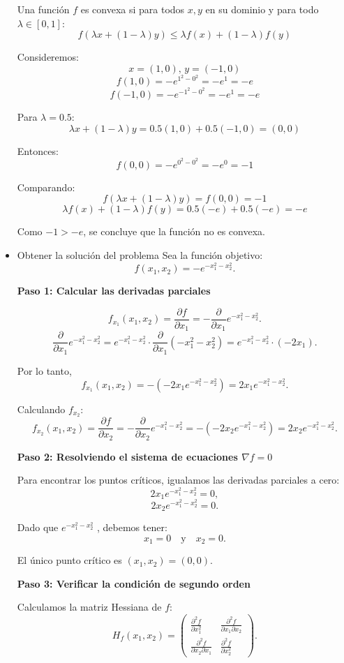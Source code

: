 \documentclass[11pt]{article}
\begin{document}
\begin{itemize}
Una función $f$ es convexa si para todos $x, y$ en su dominio y para todo $\lambda \in [0,1]$:
\[ f(\lambda x + (1-\lambda) y) \leq \lambda f(x) + (1-\lambda) f(y) \]

Consideremos:
\[ x = (1, 0), \, y = (-1, 0) \]
\[ f(1, 0) = -e^{1^2 - 0^2} = -e^1 = -e \]
\[ f(-1, 0) = -e^{-1^2 - 0^2} = -e^1 = -e \]

Para $\lambda = 0.5$:
\[ \lambda x + (1-\lambda) y = 0.5(1, 0) + 0.5(-1, 0) = (0, 0) \]

Entonces:
\[ f(0, 0) = -e^{0^2 - 0^2} = -e^0 = -1 \]

Comparando:
\[ f(\lambda x + (1-\lambda) y) = f(0, 0) = -1 \]
\[ \lambda f(x) + (1-\lambda) f(y) = 0.5(-e) + 0.5(-e) = -e \]

Como $-1 > -e$, se concluye que la función no es convexa.

    \item Obtener la solución del problema
    Sea la función objetivo:
\[
f(x_1, x_2) = -e^{-x_1^2 - x_2^2}.
\]

\textbf{Paso 1: Calcular las derivadas parciales }

\[
f_{x_1}(x_1, x_2) = \frac{\partial f}{\partial x_1} = -\frac{\partial}{\partial x_1} e^{-x_1^2 - x_2^2}.
\]
\[
\frac{\partial}{\partial x_1} e^{-x_1^2 - x_2^2} = e^{-x_1^2 - x_2^2} \cdot \frac{\partial}{\partial x_1}(-x_1^2 - x_2^2) = e^{-x_1^2 - x_2^2} \cdot (-2x_1).
\]

Por lo tanto,
\[
f_{x_1}(x_1, x_2) = -(-2x_1 e^{-x_1^2 - x_2^2}) = 2x_1 e^{-x_1^2 - x_2^2}.
\]

 Calculando \(f_{x_2}\):
\[
f_{x_2}(x_1, x_2) = \frac{\partial f}{\partial x_2} = -\frac{\partial}{\partial x_2} e^{-x_1^2 - x_2^2} = -(-2x_2 e^{-x_1^2 - x_2^2}) = 2x_2 e^{-x_1^2 - x_2^2}.
\]

\textbf{Paso 2: Resolviendo el sistema de ecuaciones \(\nabla f = 0\)}

Para encontrar los puntos críticos, igualamos las derivadas parciales a cero:
\[
2x_1 e^{-x_1^2 - x_2^2} = 0,
\]
\[
2x_2 e^{-x_1^2 - x_2^2} = 0.
\]

Dado que \(e^{-x_1^2 - x_2^2}\) , debemos tener:
\[
x_1 = 0 \quad \text{y} \quad x_2 = 0.
\]

El único punto crítico es \((x_1, x_2) = (0, 0)\).

\textbf{Paso 3: Verificar la condición de segundo orden}

Calculamos la matriz Hessiana de \(f\):
\[
H_f(x_1, x_2) = \begin{pmatrix}
\frac{\partial^2 f}{\partial x_1^2} & \frac{\partial^2 f}{\partial x_1 \partial x_2} \\
\frac{\partial^2 f}{\partial x_2 \partial x_1} & \frac{\partial^2 f}{\partial x_2^2}
\end{pmatrix}.
\]


\end{itemize}
\end{document}
